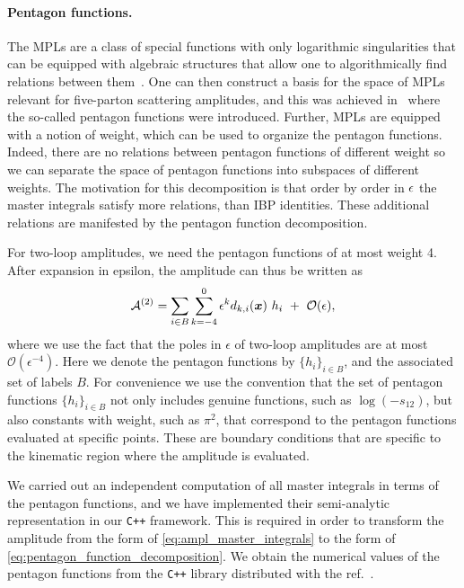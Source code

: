 \paragraph{Pentagon functions.}
The MPLs are a class of special functions with 
only logarithmic singularities that can be equipped with algebraic
structures that allow one to algorithmically find relations between
them~\cite{Goncharov:2010jf,Duhr:2011zq,Duhr:2012fh}. One can then
construct a basis for the space of MPLs relevant for five-parton
scattering amplitudes, and this was achieved in~\cite{Gehrmann:2018yef}
where the so-called pentagon functions were introduced.
Further, MPLs are equipped with a notion of weight, which can
be used to organize the pentagon functions. Indeed, there are
no relations between pentagon functions of different weight so we can
separate the space of pentagon functions into subspaces of different 
weights. 
The motivation for this decomposition is
that order by order in $\epsilon$ the master integrals satisfy more relations, than IBP identities. These additional relations are manifested by the pentagon
function decomposition.

For two-loop amplitudes, we need the pentagon functions of at most weight 4.
After expansion in epsilon, the amplitude can thus be written as
\begin{equation} \label{eq:pentagon_function_decomposition}
  \mathcal{A}^{(2)}=
    \sum_{i\in B}\sum_{k=-4}^0\epsilon^{k} d_{k,i}(\vb*{x})~h_i ~+~ \order{\eps} ,
\end{equation}
where we use the fact that the poles in $\epsilon$ of two-loop amplitudes are at most $\mathcal{O}(\epsilon^{-4})$.
Here we denote the pentagon functions by $\{h_i\}_{i\in B}$, and the associated set of labels $B$. 
For convenience we use the convention that the set of pentagon functions $\{h_i\}_{i\in B}$
not only includes genuine functions, such as $\log(-s_{12})$, but also
constants with weight, such as $\pi^2$, that correspond to the pentagon 
functions evaluated at specific points. These are boundary conditions that
are specific to the kinematic region where the amplitude is evaluated.

We carried out an independent computation of all master integrals in terms of the pentagon functions, and
we have implemented their semi-analytic representation in our \texttt{C++} framework. This is required  in order to 
transform the amplitude from the form of \cref{eq:ampl_master_integrals} to the form of \cref{eq:pentagon_function_decomposition}.
We obtain the numerical values of the pentagon functions from the \texttt{C++} library distributed with the ref.\ \cite{Gehrmann:2018yef}.

